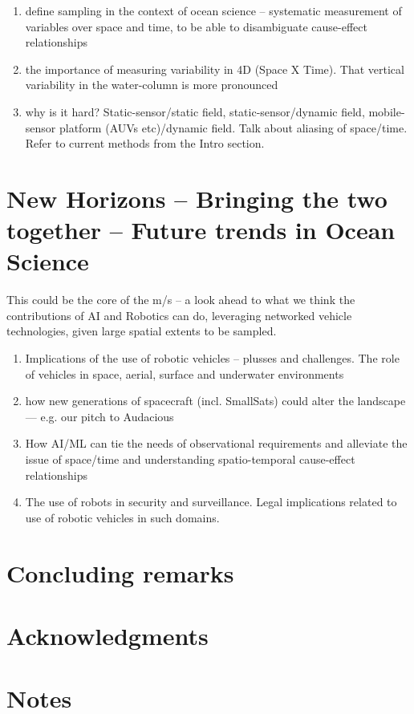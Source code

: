 \documentclass[12pt]{article}
\begin{document}
\begin{enumerate} 

\item define sampling in the context of ocean science -- systematic
  measurement of variables over space and time, to be able to
  disambiguate cause-effect relationships

\item the importance of measuring variability in 4D (Space X
  Time). That vertical variability in the water-column is more
  pronounced 
  
\item why is it hard? Static-sensor/static field,
  static-sensor/dynamic field, mobile-sensor platform (AUVs
  etc)/dynamic field. Talk about aliasing of space/time. Refer to
  current methods from the Intro section.

\end{enumerate}

\section{New Horizons -- Bringing the two together -- Future trends in Ocean Science}

This could be the core of the m/s -- a look ahead to what we think the
contributions of AI and Robotics can do, leveraging networked vehicle
technologies, given large spatial extents to be sampled. 

\begin{enumerate} 

\item Implications of the use of robotic vehicles -- plusses and
  challenges. The role of vehicles in space, aerial, surface and
  underwater environments

\item how new generations of spacecraft (incl. SmallSats) could alter
  the landscape — e.g. our pitch to Audacious
  
\item How AI/ML can tie the needs of observational requirements and
  alleviate the issue of space/time and understanding spatio-temporal
  cause-effect relationships

\item The use of robots in security and surveillance. Legal implications
  related to use of robotic vehicles in such domains. 

\end{enumerate}


\section*{Concluding remarks}








\section*{Acknowledgments}

\section{Notes}




\end{document}
